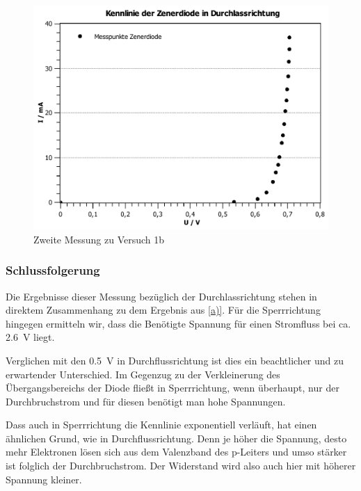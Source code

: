\documentclass[11pt,a4paper,titlepage, ngerman]{article}
\begin{document}
\begin{itemize}
				 	\begin{figure}
				 		\centering
				 		\includegraphics[width=\textwidth]{KennlinieZenerdiodeDurchlassrichtung.pdf}
				 		\caption{Zweite Messung zu Versuch 1b}
				 		\label{KL b2}
				 	\end{figure}
				 					 	
				\end{itemize}
											
			\subsubsection*{Schlussfolgerung}
				
				Die Ergebnisse dieser Messung bezüglich der Durchlassrichtung stehen in direktem Zusammenhang zu dem Ergebnis aus \ref{a)}. 
				Für die Sperrrichtung hingegen ermitteln wir, dass die Benötigte Spannung für einen Stromfluss bei ca. \SI{2.6}{\V} liegt. 
				
				Verglichen mit den \SI{0.5}{\V} in Durchflussrichtung ist dies ein beachtlicher und zu erwartender Unterschied. Im Gegenzug zu der Verkleinerung des Übergangsbereichs der Diode fließt in Sperrrichtung, wenn überhaupt, nur der Durchbruchstrom und für diesen benötigt man hohe Spannungen. 
				
				Dass auch in Sperrrichtung die Kennlinie exponentiell verläuft, hat einen ähnlichen Grund, wie in Durchflussrichtung. Denn je höher die Spannung, desto mehr Elektronen lösen sich aus dem Valenzband des p-Leiters und umso stärker ist folglich der Durchbruchstrom. Der Widerstand wird also auch hier mit höherer Spannung kleiner. 
				
\end{document}
